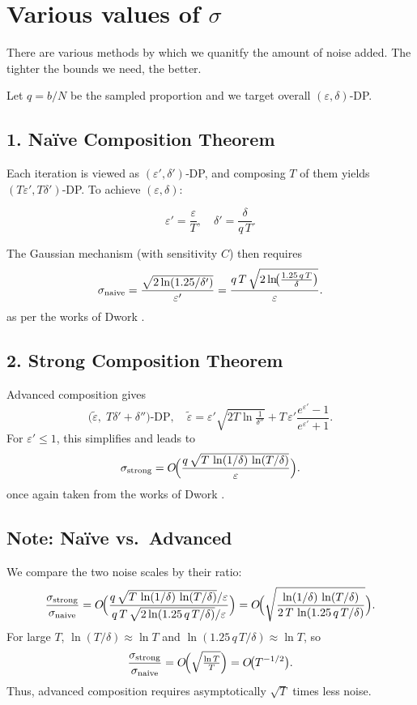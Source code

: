 \documentclass{article}
\begin{document}
\section{Various values of $\sigma$}
There are various methods by which we quanitfy the amount of noise added. The tighter the bounds we need, the better.

Let $q=b/N$ be the sampled proportion and we target overall $(\varepsilon,\delta)$‑DP.

\subsection{1. Naïve Composition Theorem}
Each iteration is viewed as $(\varepsilon',\delta')$‑DP, and composing $T$ of them yields $(T\varepsilon',T\delta')$‑DP.  To achieve $(\varepsilon,\delta)$:

\[
\varepsilon'=\frac\varepsilon T,\quad
\delta'=\frac\delta{q\,T}.
\]

The Gaussian mechanism (with sensitivity $C$) then requires
\[
\sigma_{\rm naive}
=\frac{\sqrt{2\ln(1.25/\delta')}}{\varepsilon'}
=\frac{q\,T\,\sqrt{2\ln\!\bigl(\tfrac{1.25\,q\,T}{\delta}\bigr)}}{\varepsilon}.
\]
as per the works of Dwork \cite{DR14}.

\subsection{2. Strong Composition Theorem}
Advanced composition gives
\[
\bigl(\widetilde\varepsilon,\;T\delta'+\delta''\bigr)\text{-DP},\quad
\widetilde\varepsilon
=\varepsilon'\sqrt{2T\ln\tfrac1{\delta''}}
+T\,\varepsilon'\frac{e^{\varepsilon'}-1}{e^{\varepsilon'}+1}.
\]
For $\varepsilon'\le1$, this simplifies and leads to
\[
\sigma_{\rm strong}
=O\!\Bigl(\frac{q\,\sqrt{T\,\ln(1/\delta)\,\ln(T/\delta)}}{\varepsilon}\Bigr).
\]
once again taken from the works of Dwork \cite{DR14}.

\subsection{Note: Naïve vs.\ Advanced}
We compare the two noise scales by their ratio:
\[
\frac{\sigma_{\rm strong}}{\sigma_{\rm naive}}
=O\!\Bigl(\frac{q\,\sqrt{T\,\ln(1/\delta)\,\ln(T/\delta)}/\varepsilon}
{q\,T\,\sqrt{2\ln(1.25\,q\,T/\delta)}/\varepsilon}\Bigr)
=O\!\Bigl(\sqrt{\frac{\ln(1/\delta)\,\ln(T/\delta)}{2\,T\,\ln(1.25\,q\,T/\delta)}}\Bigr).
\]
For large $T$, $\ln(T/\delta)\approx\ln T$ and $\ln(1.25\,q\,T/\delta)\approx\ln T$, so
\[
\frac{\sigma_{\rm strong}}{\sigma_{\rm naive}}
=O\!\Bigl(\sqrt{\tfrac{\ln T}{T}}\Bigr)
=O\!\bigl(T^{-1/2}\bigr).
\]
Thus, advanced composition requires asymptotically $\sqrt{T}$ times less noise.
\end{document}
